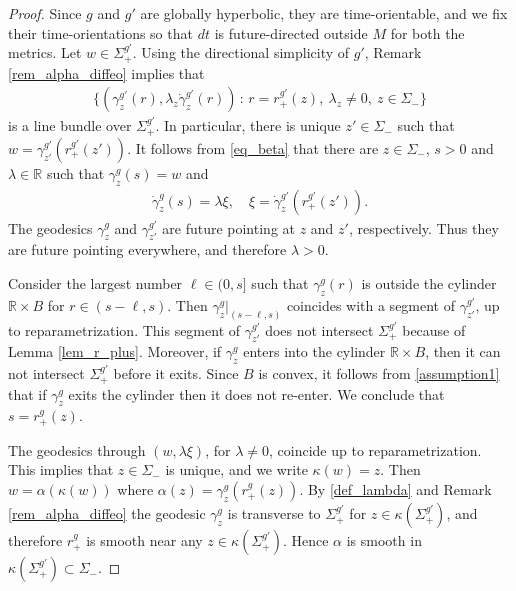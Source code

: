 \documentclass[10pt,a4paper]{amsart}
\def\R{\mathbb R}
\def\mid{\,:\,}
\begin{document}
\begin{proof}
Since $g$ and $g'$ are globally hyperbolic, they are time-orientable, and we fix their time-orientations so that $dt$ is future-directed outside $M$ for both the metrics.
Let $w \in \Sigma_+^{g'}$.
Using the directional simplicity of $g'$, Remark \ref{rem_alpha_diffeo} implies that
    \begin{align}\label{def_line_bundle}
\{(\gamma_z^{g'}(r), \lambda_z \dot \gamma_z^{g'}(r)) \mid r=r_+^{g'}(z),\ \lambda_z \ne 0, \ z \in \Sigma_{-}\}
    \end{align}
is a line bundle over $\Sigma_{+}^{g'}$.
In particular, there is unique $z' \in \Sigma_-$ such that $w = \gamma_{z'}^{g'}(r_+^{g'}(z'))$. It follows from \eqref{eq_beta} that there
are $z \in \Sigma_{-}$, $s > 0$ and $\lambda \in \R$ such that $\gamma_z^{g}(s) = w$ and 
    \begin{align}\label{def_lambda}
\dot \gamma_z^{g}(s) = \lambda \xi, \quad \xi = \dot \gamma_z^{g'}(r_+^{g'}(z')).
    \end{align}
The geodesics $\gamma_z^{g}$ and $\gamma_{z'}^{g'}$ are future pointing at $z$ and $z'$, respectively. Thus they are future pointing everywhere, and therefore $\lambda > 0$. 

Consider the largest number $\ell \in (0, s]$ such that $\gamma_z^{g}(r)$ is outside the cylinder $\R \times B$ for $r \in (s-\ell, s)$. Then $\gamma_z^{g}|_{(s-\ell, s)}$ coincides with a segment of $\gamma_{z'}^{g'}$, up to reparametrization. This segment of $\gamma_{z'}^{g'}$ does not intersect $\Sigma_+^{g'}$ because of Lemma \ref{lem_r_plus}. Moreover, if $\gamma_z^{g}$ enters into the cylinder $\R \times B$, then it can not intersect $\Sigma_+^{g'}$ before it exits. Since $B$ is convex, it follows from \eqref{assumption1} that if $\gamma_z^g$ exits the cylinder then it does not re-enter. We conclude that $s = r_+^{g}(z)$.

The geodesics through $(w, \lambda \xi)$, for $\lambda \ne 0$, coincide up to reparametrization. This implies that $z \in \Sigma_{-}$ is unique, and we write $\kappa(w) = z$. Then $w = \alpha(\kappa(w))$ where $\alpha(z) = \gamma_z^{g}(r_+^{g}(z))$. By \eqref{def_lambda} and Remark \ref{rem_alpha_diffeo} the geodesic $\gamma_z^{g}$ is transverse to $\Sigma_+^{g'}$ for $z \in \kappa(\Sigma_+^{g'})$, and therefore $r_+^{g}$ is smooth near any $z \in \kappa(\Sigma_+^{g'})$. Hence $\alpha$ is smooth in $\kappa(\Sigma_+^{g'}) \subset \Sigma_-$. 


\end{proof}
\end{document}

